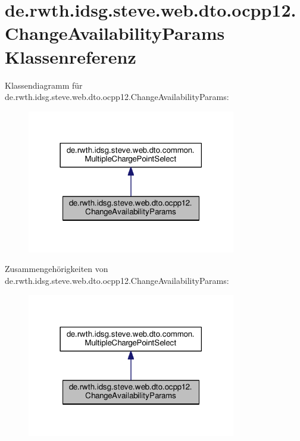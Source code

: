 \hypertarget{classde_1_1rwth_1_1idsg_1_1steve_1_1web_1_1dto_1_1ocpp12_1_1_change_availability_params}{\section{de.\+rwth.\+idsg.\+steve.\+web.\+dto.\+ocpp12.\+Change\+Availability\+Params Klassenreferenz}
\label{classde_1_1rwth_1_1idsg_1_1steve_1_1web_1_1dto_1_1ocpp12_1_1_change_availability_params}
}


Klassendiagramm für de.\+rwth.\+idsg.\+steve.\+web.\+dto.\+ocpp12.\+Change\+Availability\+Params\+:\nopagebreak
\begin{figure}[H]
\begin{center}
\leavevmode
\includegraphics[width=258pt]{classde_1_1rwth_1_1idsg_1_1steve_1_1web_1_1dto_1_1ocpp12_1_1_change_availability_params__inherit__graph}
\end{center}
\end{figure}


Zusammengehörigkeiten von de.\+rwth.\+idsg.\+steve.\+web.\+dto.\+ocpp12.\+Change\+Availability\+Params\+:\nopagebreak
\begin{figure}[H]
\begin{center}
\leavevmode
\includegraphics[width=258pt]{classde_1_1rwth_1_1idsg_1_1steve_1_1web_1_1dto_1_1ocpp12_1_1_change_availability_params__coll__graph}
\end{center}
\end{figure}


